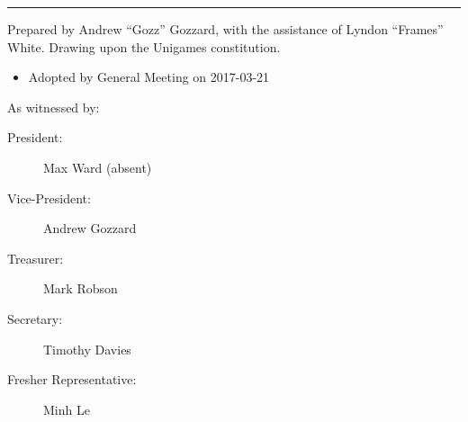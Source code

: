 \documentclass[a4paper]{article}
\begin{document}
\pagebreak{}

\noindent \rule{1\columnwidth}{1pt}

\medskip{}

\noindent Prepared by Andrew ``Gozz'' Gozzard, with the assistance of Lyndon ``Frames'' White. Drawing upon the Unigames constitution.

\medskip{}

\begin{itemize}
	\item[] Adopted by General Meeting on 2017-03-21
\end{itemize}

\medskip{}

\noindent As witnessed by:
\begin{description}
\item [{President:}] Max Ward (absent) \hrulefill
\item [{Vice-President:}] Andrew Gozzard \hrulefill
\item [{Treasurer:}] Mark Robson \hrulefill
\item [{Secretary:}] Timothy Davies \hrulefill
\item [{Fresher Representative:}] Minh Le \hrulefill
\end{description}
\end{document}
